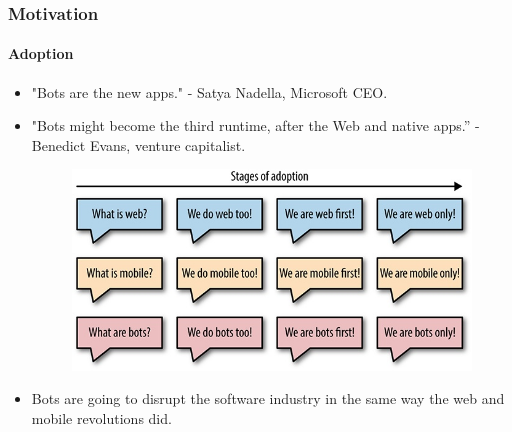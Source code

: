 \documentclass[11pt]{beamer}
\begin{document}
\begin{frame}
	\frametitle{Motivation}
	\framesubtitle{Adoption}
	\begin{itemize}
		\item "Bots are the new apps." - Satya Nadella, Microsoft CEO.
		\item "Bots might become the third runtime, after the Web and native apps.” - Benedict Evans, venture capitalist.
		\begin{figure}[h]
			\centering
			\includegraphics[scale=.3]{images/four-phases-of-adoption}
			\label{trello}
		\end{figure}
		\item Bots are going to disrupt the software industry in the same way the web and mobile revolutions did.
	\end{itemize}
\end{frame}
\end{document}
